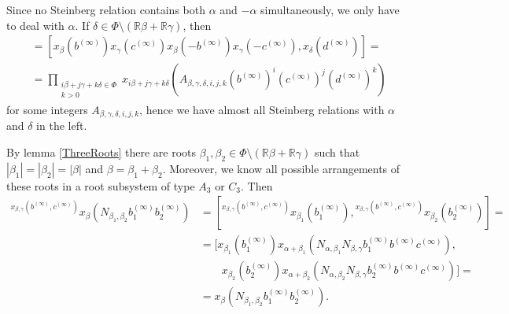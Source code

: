 \documentclass{article}
\numberwithin{equation}{section}
\theoremstyle{definition}
\theoremstyle{remark}
\newcommand{\up}[2]{{^{#1}\!{#2}}}
\begin{document}
 
Since no Steinberg relation contains both \(\alpha\) and \(-\alpha\) simultaneously, we only have to deal with \(\alpha\).  
 If \(\delta \in \Phi \setminus (\mathbb R \beta + \mathbb R \gamma)\), then
 \begin{align*}
  [x_{\beta, \gamma}(b^{(\infty)}, c^{(\infty)}),
  x_\delta(d^{(\infty)})]
  &= [x_\beta(b^{(\infty)}) x_\gamma(c^{(\infty)})
   x_\beta(-b^{(\infty)}) x_\gamma(-c^{(\infty)}),
  x_\delta(d^{(\infty)})] =\\
  &= \prod_{\substack{i\beta + j\gamma + k\delta \in \Phi\\ k > 0}}
  x_{i\beta + j\gamma + k\delta}
   (A_{\beta, \gamma, \delta, i, j, k}
   (b^{(\infty)})^i (c^{(\infty)})^j (d^{(\infty)})^k)
 \end{align*}
 for some integers \(A_{\beta, \gamma, \delta, i, j, k}\),
 hence we have almost all Steinberg relations with \(\alpha\) and \(\delta\) in the left.

By lemma \ref{ThreeRoots} there are roots \(\beta_1, \beta_2 \in \Phi \setminus (\mathbb R \beta + \mathbb R \gamma)\) such that \(|\beta_1| = |\beta_2| = |\beta|\) and \(\beta = \beta_1 + \beta_2\). Moreover, we know all possible arrangements of these roots in a root subsystem of type \(A_3\) or \(C_3\). Then
 \begin{align*}
  \up{x_{\beta, \gamma}(b^{(\infty)}, c^{(\infty)})}
  {x_\beta(N_{\beta_1, \beta_2}
   b_1^{(\infty)} b_2^{(\infty)})}
  &= [\up{x_{\beta, \gamma}(b^{(\infty)}, c^{(\infty)})}
   {x_{\beta_1}(b_1^{(\infty)})},
  \up{x_{\beta, \gamma}(b^{(\infty)}, c^{(\infty)})}
   {x_{\beta_2}(b_2^{(\infty)})}] =\\
  &= [x_{\beta_1}(b_1^{(\infty)})
   x_{\alpha + \beta_1}(N_{\alpha, \beta_1} N_{\beta, \gamma}
   b_1^{(\infty)} b^{(\infty)} c^{(\infty)}),\\
  &\qquad x_{\beta_2}(b_2^{(\infty)})
   x_{\alpha + \beta_2}(N_{\alpha, \beta_2} N_{\beta, \gamma}
   b_2^{(\infty)} b^{(\infty)} c^{(\infty)})] =\\
  &= x_\beta(N_{\beta_1, \beta_2} b_1^{(\infty)} b_2^{(\infty)}).
 \end{align*}
\end{document}
